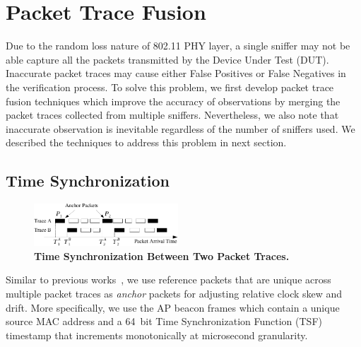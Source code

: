 \section{Packet Trace Fusion}
\label{sec:fusion}

Due to the random loss nature of 802.11 PHY layer, a single sniffer may not be
able capture all the packets transmitted by the Device Under Test (DUT).
Inaccurate packet traces may cause either False Positives or False Negatives in
the verification process. To solve this problem, we first develop packet trace
fusion techniques which improve the accuracy of observations by merging the
packet traces collected from multiple sniffers. Nevertheless, we
also note that  inaccurate observation is inevitable regardless of the
number of sniffers used. We described the techniques to address this problem in
next section.

\subsection{Time Synchronization}
\label{subsec:sync}

\begin{figure}[t!]
  \centering
  \includegraphics[width=0.48\textwidth]{./figures/sync.pdf}
  \caption{\textbf{Time Synchronization Between Two Packet Traces.}}
  \label{fig:sync}
\end{figure}

Similar to previous
works~\cite{Yeo:2004:FWL:1023646.1023660,Mahajan:2006:AMB:1159913.1159923,Cheng:2006:JSP:1159913.1159920},
we use reference packets that are unique across multiple packet traces as
\textit{anchor} packets for adjusting relative clock skew and drift. More
specifically, we use the AP beacon frames which contain a unique source MAC
address and a 64~bit Time Synchronization Function (TSF) timestamp that
increments monotonically at microsecond granularity.

